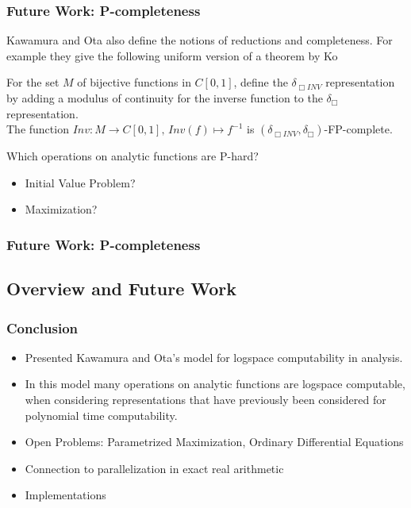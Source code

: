 \documentclass[xcolor=pdftex,dvipsnames,table]{beamer}
\begin{document}
\begin{frame}
  \frametitle{Future Work: P-completeness}
  Kawamura and Ota also define the notions of reductions and completeness.
  \pause
  For example they give the following uniform version of a theorem by Ko
  \begin{theorem}
    For the set $M$ of bijective functions in $C[0,1]$, define the $\delta_{\Box INV}$ representation by adding a modulus of continuity for the inverse function to the $\delta_{\Box}$ representation.\\
    The function $Inv: M \to C[0,1],\, Inv(f) \mapsto f^{-1}$ is $(\delta_{\Box INV}, \delta_{\Box})$-FP-complete.
  \end{theorem}
  \pause
  Which operations on analytic functions are P-hard?
  \begin{itemize}
  \item Initial Value Problem?
    \item Maximization?
    \end{itemize}
\end{frame}
\begin{frame}
  \frametitle{Future Work: P-completeness}
\end{frame}
\subsection*{Overview and Future Work}
\begin{frame}
  \frametitle{Conclusion}
  \begin{itemize}
    \item Presented Kawamura and Ota's model for logspace computability in analysis.
    \item In this model many operations on analytic functions are logspace computable, when considering representations that have previously been considered for polynomial time computability.
    \item Open Problems: Parametrized Maximization, Ordinary Differential Equations
     \item Connection to parallelization in exact real arithmetic
     \item Implementations
  \end{itemize}
\end{frame}
\end{document}
